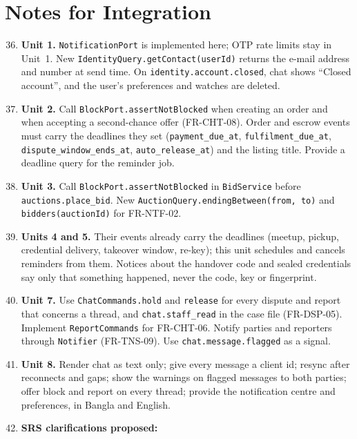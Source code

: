 \documentclass[11pt,a4paper]{article}
\begin{document}
\section{Notes for Integration}
\label{sec:notes}
\begin{enumerate}[label=\textbf{I-\arabic*}, leftmargin=*, nosep]
  \setcounter{enumi}{35}
  \item \textbf{Unit 1.} \texttt{NotificationPort} is implemented here; OTP rate limits stay in Unit~1. New \texttt{IdentityQuery.getContact(userId)} returns the e-mail address and number at send time. On \texttt{identity.account.closed}, chat shows ``Closed account'', and the user's preferences and watches are deleted.
  \item \textbf{Unit 2.} Call \texttt{BlockPort.assertNotBlocked} when creating an order and when accepting a second-chance offer (FR-CHT-08). Order and escrow events must carry the deadlines they set (\texttt{payment\_due\_at}, \texttt{fulfilment\_due\_at}, \texttt{dispute\_window\_ends\_at}, \texttt{auto\_release\_at}) and the listing title. Provide a deadline query for the reminder job.
  \item \textbf{Unit 3.} Call \texttt{BlockPort.assertNotBlocked} in \texttt{BidService} before \texttt{auctions.place\_bid}. New \texttt{AuctionQuery.endingBetween(from, to)} and \texttt{bidders(auctionId)} for FR-NTF-02.
  \item \textbf{Units 4 and 5.} Their events already carry the deadlines (meetup, pickup, credential delivery, takeover window, re-key); this unit schedules and cancels reminders from them. Notices about the handover code and sealed credentials say only that something happened, never the code, key or fingerprint.
  \item \textbf{Unit 7.} Use \texttt{ChatCommands.hold} and \texttt{release} for every dispute and report that concerns a thread, and \texttt{chat.staff\_read} in the case file (FR-DSP-05). Implement \texttt{ReportCommands} for FR-CHT-06. Notify parties and reporters through \texttt{Notifier} (FR-TNS-09). Use \texttt{chat.message.flagged} as a signal.
  \item \textbf{Unit 8.} Render chat as text only; give every message a client id; resync after reconnects and gaps; show the warnings on flagged messages to both parties; offer block and report on every thread; provide the notification centre and preferences, in Bangla and English.
  \item \textbf{SRS clarifications proposed:}
  \begin{itemize}[nosep]

\end{itemize}
\end{enumerate}
\end{document}
